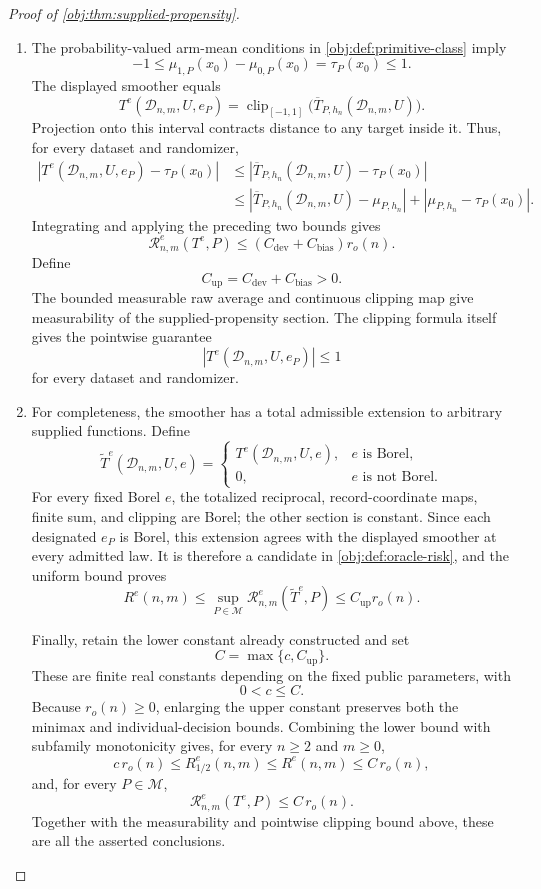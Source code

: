 \documentclass[11pt]{article}
\begin{document}
\begin{proof}[Proof of \cref{obj:thm:supplied-propensity}]
\begin{enumerate}
\item The probability-valued arm-mean conditions in \cref{obj:def:primitive-class} imply
\[
-1
\le
\mu_{1,P}(x_0)-\mu_{0,P}(x_0)
=
\tau_P(x_0)
\le1.
\]
The displayed smoother equals
\[
T^e(\mathcal D_{n,m},U,e_P)
=
\operatorname{clip}_{[-1,1]}
\bigl(\overline T_{P,h_n}(\mathcal D_{n,m},U)\bigr).
\]
Projection onto this interval contracts distance to any target inside it. Thus, for every dataset and randomizer,
\[
\begin{aligned}
|T^e(\mathcal D_{n,m},U,e_P)-\tau_P(x_0)|
&\le|\overline T_{P,h_n}(\mathcal D_{n,m},U)-\tau_P(x_0)|\\
&\le
|\overline T_{P,h_n}(\mathcal D_{n,m},U)-\mu_{P,h_n}|
+
|\mu_{P,h_n}-\tau_P(x_0)|.
\end{aligned}
\]
Integrating and applying the preceding two bounds gives
\[
\mathcal R^e_{n,m}(T^e,P)
\le
(C_{\mathrm{dev}}+C_{\mathrm{bias}})r_o(n).
\]
Define
\[
C_{\mathrm{up}}=C_{\mathrm{dev}}+C_{\mathrm{bias}}>0.
\]
The bounded measurable raw average and continuous clipping map give measurability of the supplied-propensity section. The clipping formula itself gives the pointwise guarantee
\[
\left|T^e(\mathcal D_{n,m},U,e_P)\right|\le1
\]
for every dataset and randomizer.

\item For completeness, the smoother has a total admissible extension to arbitrary supplied functions. Define
\[
\widetilde T^e(\mathcal D_{n,m},U,e)=
\begin{cases}
T^e(\mathcal D_{n,m},U,e),&e\text{ is Borel},\\
0,&e\text{ is not Borel}.
\end{cases}
\]
For every fixed Borel \(e\), the totalized reciprocal, record-coordinate maps, finite sum, and clipping are Borel; the other section is constant. Since each designated \(e_P\) is Borel, this extension agrees with the displayed smoother at every admitted law. It is therefore a candidate in \cref{obj:def:oracle-risk}, and the uniform bound proves
\[
R^e(n,m)
\le
\sup_{P\in\mathcal M}
\mathcal R^e_{n,m}(\widetilde T^e,P)
\le C_{\mathrm{up}}r_o(n).
\]

Finally, retain the lower constant already constructed and set
\[
C=\max\{c,C_{\mathrm{up}}\}.
\]
These are finite real constants depending on the fixed public parameters, with
\[
0<c\le C.
\]
Because \(r_o(n)\ge0\), enlarging the upper constant preserves both the minimax and individual-decision bounds. Combining the lower bound with subfamily monotonicity gives, for every \(n\ge2\) and \(m\ge0\),
\[
c\,r_o(n)
\le R^e_{1/2}(n,m)
\le R^e(n,m)
\le C\,r_o(n),
\]
and, for every \(P\in\mathcal M\),
\[
\mathcal R^e_{n,m}(T^e,P)\le C\,r_o(n).
\]
Together with the measurability and pointwise clipping bound above, these are all the asserted conclusions.
\end{enumerate}
\end{proof}
\end{document}
